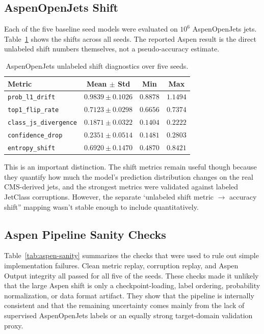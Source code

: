 \subsection{AspenOpenJets Shift}

Each of the five baseline seed models were evaluated on $10^6$  AspenOpenJets jets. Table~\ref{tab:aspen-shift} shows the shifts across all seeds. The reported Aspen result is the direct unlabeled shift numbers themselves, not a pseudo-accuracy estimate.

\begin{table}[t]
\centering
\caption{AspenOpenJets unlabeled shift diagnostics over five seeds.}
\label{tab:aspen-shift}
\begin{tabular}{lccc}
\toprule
Metric & Mean $\pm$ Std & Min & Max \\
\midrule
\texttt{prob\_l1\_drift} & $0.9839 \pm 0.1026$ & $0.8878$ & $1.1494$ \\
\texttt{top1\_flip\_rate} & $0.7123 \pm 0.0298$ & $0.6656$ & $0.7374$ \\
\texttt{class\_js\_divergence} & $0.1871 \pm 0.0322$ & $0.1404$ & $0.2222$ \\
\texttt{confidence\_drop} & $0.2351 \pm 0.0514$ & $0.1481$ & $0.2803$ \\
\texttt{entropy\_shift} & $0.6920 \pm 0.1470$ & $0.4870$ & $0.8421$ \\
\bottomrule
\end{tabular}
\end{table}

This is an important distinction. The shift metrics remain useful though because they quantify how much the model’s prediction distribution changes on the real CMS-derived jets, and the strongest metrics were validated against labeled JetClass corruptions. However, the separate ‘unlabeled shift metric $\rightarrow$ accuracy shift'' mapping wasn’t stable enough to include quantitatively. 


\subsection{Aspen Pipeline Sanity Checks}

Table~\ref{tab:aspen-sanity} summarizes the checks that were used to rule out simple implementation failures. Clean metric replay, corruption replay, and Aspen Output integrity all passed for all five of the seeds. These checks made it unlikely that the large Aspen shift is only a checkpoint-loading, label ordering, probability normalization, or data format artifact. They show that the pipeline is internally consistent and that the remaining uncertainty comes mainly from the lack of supervised AspenOpenJets labels or an equally strong target-domain validation proxy.

